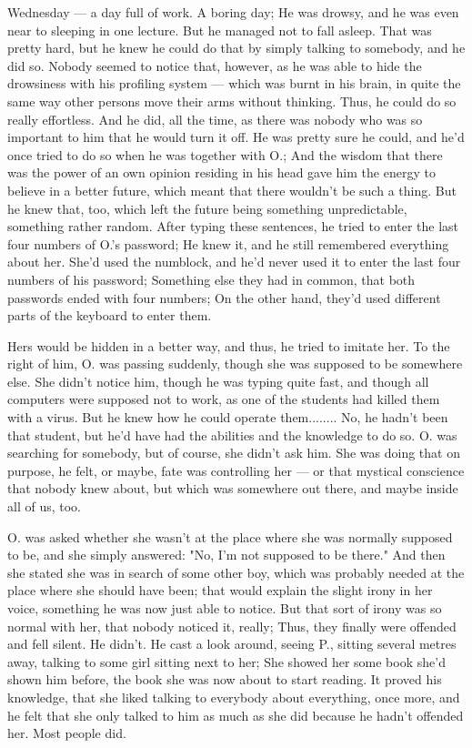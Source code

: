 Wednesday --- a day full of work. A boring day; He was drowsy, and he was even near to sleeping in one lecture. But he managed not to fall asleep. 
That was pretty hard, but he knew he could do that by simply talking to somebody, and he did so. 
Nobody seemed to notice that, however, as he was able to hide the drowsiness with his profiling system --- which was burnt in his brain, in quite the same way other persons move their arms without thinking. Thus, he could do so really effortless. 
And he did, all the time, as there was nobody who was so important to him that he would turn it off. He was pretty sure he could, and he'd once tried to do so when he was together with O.; And the wisdom that there was the power of an own opinion residing in his head gave him the energy to believe in a better future, which meant that there wouldn't be such a thing. 
But he knew that, too, which left the future being something unpredictable, something rather random. 
After typing these sentences, he tried to enter the last four numbers of O.'s password; He knew it, and he still remembered everything about her. 
She'd used the numblock, and he'd never used it to enter the last four numbers of his password; Something else they had in common, that both passwords ended with four numbers; On the other hand, they'd used different parts of the keyboard to enter them.

Hers would be hidden in a better way, and thus, he tried to imitate her. 
To the right of him, O. was passing suddenly, though she was supposed to be somewhere else. 
She didn't notice him, though he was typing quite fast, and though all computers were supposed not to work, as one of the students had killed them with a virus. But he knew how he could operate them........
No, he hadn't been that student, but he'd have had the abilities and the knowledge to do so. 
O. was searching for somebody, but of course, she didn't ask him. She was doing that on purpose, he felt, or maybe, fate was controlling her --- or that mystical conscience that nobody knew about, but which was somewhere out there, and maybe inside all of us, too.

O. was asked whether she wasn't at the place where she was normally supposed to be, and she simply answered: "No, I'm not supposed to be there."
And then she stated she was in search of some other boy, which was probably needed at the place where she should have been; that would explain the slight irony in her voice, something he was now just able to notice. 
But that sort of irony was so normal with her, that nobody noticed it, really; Thus, they finally were offended and fell silent. He didn't. He cast a look around, seeing P., sitting several metres away, talking to some girl sitting next to her; She showed her some book she'd shown him before, the book she was now about to start reading. It proved his knowledge, that she liked talking to everybody about everything, once more, and he felt that she only talked to him as much as she did because he hadn't offended her. 
Most people did.

